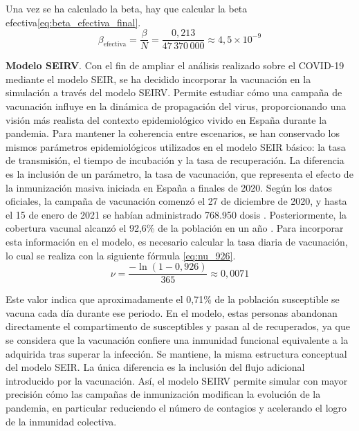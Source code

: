 Una vez se ha calculado la beta, hay que calcular la beta efectiva\eqref{eq:beta_efectiva_final}.
\begin{equation}
\beta_{\text{efectiva}} = \frac{\beta}{N} = \frac{0{,}213}{47\,370\,000} \approx 4{,}5 \times 10^{-9}
\label{eq:beta_efectiva_final}
\end{equation}

\vspace{2em}


\textbf{Modelo SEIRV}. Con el fin de ampliar el análisis realizado sobre el COVID-19 mediante el modelo SEIR, se ha decidido incorporar la vacunación en la simulación a través del modelo SEIRV. Permite estudiar cómo una campaña de vacunación influye en la dinámica de propagación del virus, proporcionando una visión más realista del contexto epidemiológico vivido en España durante la pandemia.
Para mantener la coherencia entre escenarios, se han conservado los mismos parámetros epidemiológicos utilizados en el modelo SEIR básico: la tasa de transmisión, el tiempo de incubación y la tasa de recuperación. La diferencia es la inclusión de un parámetro, la tasa de vacunación, que representa el efecto de la inmunización masiva iniciada en España a finales de 2020.
Según los datos oficiales, la campaña de vacunación comenzó el 27 de diciembre de 2020, y hasta el 15 de enero de 2021 se habían administrado 768.950 dosis \cite{sanidad_giv_20210115}. Posteriormente, la cobertura vacunal alcanzó el 92,6\% de la población en un año \cite{sanidad_historico_covid}. Para incorporar esta información en el modelo, es necesario calcular la tasa diaria de vacunación, lo cual se realiza con la siguiente fórmula \eqref{eq:nu_926}.
\begin{equation}
\nu = \frac{-\ln(1 - 0{,}926)}{365} \approx 0{,}0071
\label{eq:nu_926}
\end{equation}

Este valor indica que aproximadamente el 0,71\% de la población susceptible se vacuna cada día durante ese periodo. En el modelo, estas personas abandonan directamente el compartimento de susceptibles y pasan al de recuperados, ya que se considera que la vacunación confiere una inmunidad funcional equivalente a la adquirida tras superar la infección.
Se mantiene, la misma estructura conceptual del modelo SEIR. La única diferencia es la inclusión del flujo adicional introducido por la vacunación. Así, el modelo SEIRV permite simular con mayor precisión cómo las campañas de inmunización modifican la evolución de la pandemia, en particular reduciendo el número de contagios y acelerando el logro de la inmunidad colectiva.






